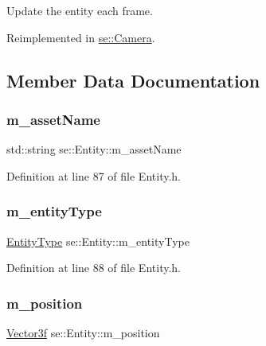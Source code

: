 Update the entity each frame. 

Reimplemented in \mbox{\hyperlink{classse_1_1_camera_abecf2d50dc793707a475b35bb487812c}{se\+::\+Camera}}.



\subsection{Member Data Documentation}
\mbox{\label{classse_1_1_entity_aba1f7cc3700caee65b20c423185ab7ca}} 
\subsubsection{\texorpdfstring{m\+\_\+asset\+Name}{m\_assetName}}
{\footnotesize\ttfamily std\+::string se\+::\+Entity\+::m\+\_\+asset\+Name\hspace{0.3cm}{\ttfamily [protected]}}



Definition at line 87 of file Entity.\+h.

\mbox{\label{classse_1_1_entity_ac5d4a145ef27824a21ea1a4cb7a63e6c}} 
\subsubsection{\texorpdfstring{m\+\_\+entity\+Type}{m\_entityType}}
{\footnotesize\ttfamily \mbox{\hyperlink{namespacese_ae73a909a94998bc95235eb9b16e405f1}{Entity\+Type}} se\+::\+Entity\+::m\+\_\+entity\+Type\hspace{0.3cm}{\ttfamily [protected]}}



Definition at line 88 of file Entity.\+h.

\mbox{\label{classse_1_1_entity_ad59d1f9af185f480cd028db43d4ad0f2}} 
\subsubsection{\texorpdfstring{m\+\_\+position}{m\_position}}
{\footnotesize\ttfamily \mbox{\hyperlink{namespacese_a12e07512d95e2fdebdaf74a5ea2cf5f6}{Vector3f}} se\+::\+Entity\+::m\+\_\+position\hspace{0.3cm}{\ttfamily [protected]}}



